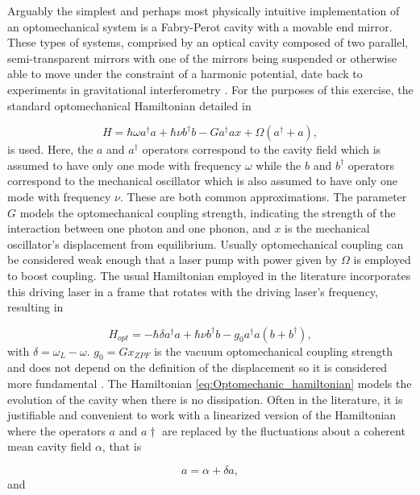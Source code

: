 \documentclass[12pt]{article}
\begin{document}
Arguably the simplest and perhaps most physically intuitive implementation of an optomechanical system is a Fabry-Perot cavity with a movable end mirror. These types of systems, comprised by an optical cavity composed of two parallel, semi-transparent mirrors with one of the mirrors being suspended or otherwise able to move under the constraint of a harmonic potential, date back to experiments in gravitational interferometry \cite{AbramoviciLIGO1992}. For the purposes of this exercise,  the standard optomechanical Hamiltonian detailed in \cite{LawMovingMirror1995}

\begin{equation}\label{eq:basic_hamiltonian}
    H=\hbar \omega a^\dagger a + \hbar\nu b^\dagger b - G a^\dagger a x+ \Omega(a^\dagger+a),
\end{equation}  is used. Here, the $a$ and $a^\dagger$ operators correspond to the cavity field which is assumed to have only one mode with frequency $\omega$ while the $b$ and $b^\dagger$ operators correspond to the mechanical oscillator which is also assumed to have only one mode with frequency $\nu$. These are both common approximations.  The parameter $G$ models the optomechanical coupling strength, indicating the strength of the interaction between one photon and one phonon, and $x$ is the mechanical oscillator's displacement from equilibrium.  Usually optomechanical coupling can be considered weak enough that a laser pump with power given by $\Omega$ is employed to boost coupling. The usual Hamiltonian employed in the literature incorporates this driving laser in a frame that rotates with the driving laser's frequency, resulting in

\begin{equation}\label{eq:Optomechanic_hamiltonian}
    H_{opt}=-\hbar \delta a^\dagger a + \hbar\nu b^\dagger b - g_0 a^\dagger a (b+b^\dagger) ,
\end{equation} with $\delta = \omega_L-\omega$. $g_0 = G x_{ZPF}$ is the vacuum optomechanical coupling strength and does not depend on the definition of the displacement so it is considered more fundamental \cite{AspelmeyerOptomechanics2014}. The Hamiltonian \eqref{eq:Optomechanic_hamiltonian} models the evolution of the cavity when there is no dissipation. Often in the literature, it is justifiable and convenient to work with a linearized version of the Hamiltonian where the operators $a$ and $a\dagger$ are replaced by the fluctuations about a coherent mean cavity field $\alpha$, that is

\begin{equation}
    a = \alpha + \delta a,
\end{equation} and
\end{document}
